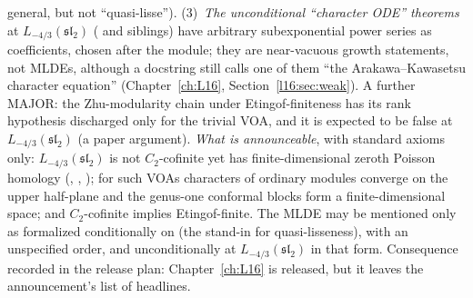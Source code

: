 general, but not ``quasi-lisse''). (3)~\emph{The unconditional ``character ODE'' theorems} at $L_{-4/3}(\mathfrak{sl}_2)$
( and siblings) have arbitrary subexponential power series as
coefficients, chosen after the module; they are near-vacuous growth statements, not MLDEs, although a docstring still
calls one of them ``the Arakawa--Kawasetsu character equation'' (Chapter~\ref{ch:L16}, Section~\ref{l16:sec:weak}).
A further MAJOR: the Zhu-modularity chain under Etingof-finiteness has its rank hypothesis discharged only for the trivial
VOA, and it is expected to be false at $L_{-4/3}(\mathfrak{sl}_2)$ (a paper argument). \emph{What is announceable}, with
standard axioms only: $L_{-4/3}(\mathfrak{sl}_2)$ is not $C_2$-cofinite yet has finite-dimensional zeroth Poisson
homology (, ,
); for such VOAs characters of ordinary modules converge on the upper half-plane
and the genus-one conformal blocks form a finite-dimensional space; and $C_2$-cofinite implies Etingof-finite. The
MLDE may be mentioned only as formalized conditionally on  (the stand-in for quasi-lisseness), with an
unspecified order, and unconditionally at $L_{-4/3}(\mathfrak{sl}_2)$ in that form. Consequence recorded in the release
plan: Chapter~\ref{ch:L16} is released, but it leaves the announcement's list of headlines.

